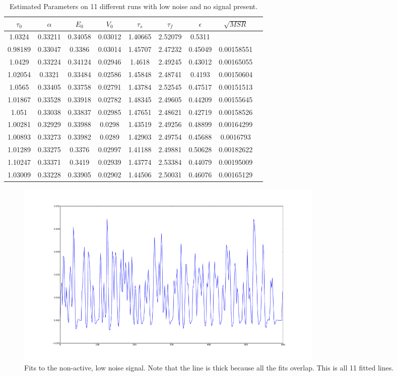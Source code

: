 \begin{table}[t]
\centering
\begin{tabular}{|c | c | c | c | c | c | c | c | c |}
\hline 
$\tau_0$ & $\alpha$ & $E_0$    & $V_0$    & $\tau_s$ & $\tau_f$ & $\epsilon$  &  $\sqrt{MSR}$   \\
\hline 
1.0324 & 0.33211 & 0.34058 & 0.03012 & 1.40665 & 2.52079 & 0.5311 & \\
 0.98189 & 0.33047 & 0.3386 & 0.03014 & 1.45707 & 2.47232 & 0.45049 & 0.00158551 \\
 1.0429 & 0.33224 & 0.34124 & 0.02946 & 1.4618 & 2.49245 & 0.43012 &  0.00165055 \\
 1.02054 & 0.3321 & 0.33484 & 0.02586 & 1.45848 & 2.48741 & 0.4193 &  0.00150604 \\
 1.0565 & 0.33405 & 0.33758 & 0.02791 & 1.43784 & 2.52545 & 0.47517 & 0.00151513 \\
 1.01867 & 0.33528 & 0.33918 & 0.02782 & 1.48345 & 2.49605 & 0.44209 &0.00155645 \\
 1.051 & 0.33038 & 0.33837 & 0.02985 & 1.47651 & 2.48621 & 0.42719 &  0.00158526 \\
 1.00281 & 0.32929 & 0.33988 & 0.0298 & 1.43519 & 2.49256 & 0.48899 & 0.00164299 \\
 1.00893 & 0.33273 & 0.33982 & 0.0289 & 1.42903 & 2.49754 & 0.45688 & 0.0016793  \\
 1.01289 & 0.33275 & 0.3376 & 0.02997 & 1.41188 & 2.49881 & 0.50628 & 0.00182622 \\
 1.10247 & 0.33371 & 0.3419 & 0.02939 & 1.43774 & 2.53384 & 0.44079 & 0.00195009 \\
\hline                                                                
1.03009 & 0.33228 & 0.33905 & 0.02902 & 1.44506 & 2.50031 & 0.46076 & 0.00165129 \\
\hline 
\end{tabular}
\caption{Estimated Parameters on 11 different runs with low noise and no signal present.}
\label{tab:NoiseOnlyResults} 
\end{table}

\begin{figure}[H]
\centering
\includegraphics[clip=true,trim=6cm 3cm 6cm 3cm,height=9cm]{images/fits_noiseonly}
\caption{Fits to the non-active, low noise signal. Note that the line is thick because all
the fits overlap. This is all 11 fitted lines.}
\label{fig:fits_noiseonly}
\end{figure}

